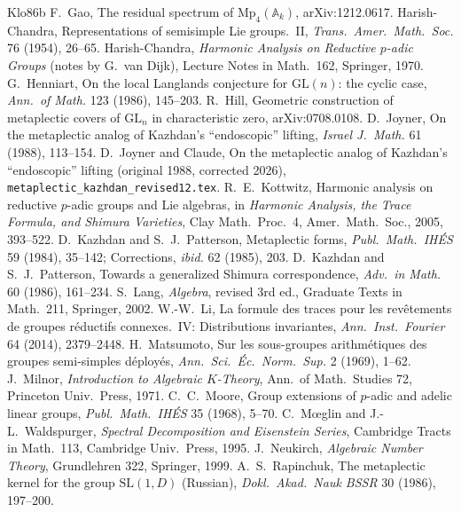 \documentclass[12pt]{article}
\newcommand{\A}{\mathbb{A}}
\newcommand{\GL}{\mathrm{GL}}
\theoremstyle{plain}
\theoremstyle{definition}
\begin{document}
\begin{thebibliography}{Klo86b}
 F.~Gao, The residual spectrum of $\mathrm{Mp}_4(\A_k)$, arXiv:1212.0617.
 Harish-Chandra, Representations of semisimple Lie groups.\ II, \emph{Trans.\ Amer.\ Math.\ Soc.} 76 (1954), 26--65.
 Harish-Chandra, \emph{Harmonic Analysis on Reductive $p$-adic Groups} (notes by G.~van Dijk), Lecture Notes in Math.\ 162, Springer, 1970.
 G.~Henniart, On the local Langlands conjecture for $\GL(n)$: the cyclic case, \emph{Ann.\ of Math.} 123 (1986), 145--203.
 R.~Hill, Geometric construction of metaplectic covers of $\GL_n$ in characteristic zero, arXiv:0708.0108.
 D.~Joyner, On the metaplectic analog of Kazhdan's ``endoscopic'' lifting, \emph{Israel J.\ Math.} 61 (1988), 113--154.
 D.~Joyner and Claude, On the metaplectic analog of Kazhdan's ``endoscopic'' lifting (original 1988, corrected 2026), \texttt{metaplectic\_kazhdan\_revised12.tex}.
 R.~E.~Kottwitz, Harmonic analysis on reductive $p$-adic groups and Lie algebras, in \emph{Harmonic Analysis, the Trace Formula, and Shimura Varieties}, Clay Math.\ Proc.\ 4, Amer.\ Math.\ Soc., 2005, 393--522.
 D.~Kazhdan and S.~J.~Patterson, Metaplectic forms, \emph{Publ.\ Math.\ IH\'ES} 59 (1984), 35--142; Corrections, \emph{ibid.} 62 (1985), 203.
 D.~Kazhdan and S.~J.~Patterson, Towards a generalized Shimura correspondence, \emph{Adv.\ in Math.} 60 (1986), 161--234.
 S.~Lang, \emph{Algebra}, revised 3rd ed., Graduate Texts in Math.\ 211, Springer, 2002.
 W.-W.~Li, La formule des traces pour les rev\^etements de groupes r\'eductifs connexes.\ IV: Distributions invariantes, \emph{Ann.\ Inst.\ Fourier} 64 (2014), 2379--2448.
 H.~Matsumoto, Sur les sous-groupes arithm\'etiques des groupes semi-simples d\'eploy\'es, \emph{Ann.\ Sci.\ \'Ec.\ Norm.\ Sup.} 2 (1969), 1--62.
 J.~Milnor, \emph{Introduction to Algebraic $K$-Theory}, Ann.\ of Math.\ Studies 72, Princeton Univ.\ Press, 1971.
 C.~C.~Moore, Group extensions of $p$-adic and adelic linear groups, \emph{Publ.\ Math.\ IH\'ES} 35 (1968), 5--70.
 C.~M\oe glin and J.-L.~Waldspurger, \emph{Spectral Decomposition and Eisenstein Series}, Cambridge Tracts in Math.\ 113, Cambridge Univ.\ Press, 1995.
 J.~Neukirch, \emph{Algebraic Number Theory}, Grundlehren 322, Springer, 1999.
 A.~S.~Rapinchuk, The metaplectic kernel for the group $\mathrm{SL}(1,D)$ (Russian), \emph{Dokl.\ Akad.\ Nauk BSSR} 30 (1986), 197--200.

\end{thebibliography}
\end{document}
